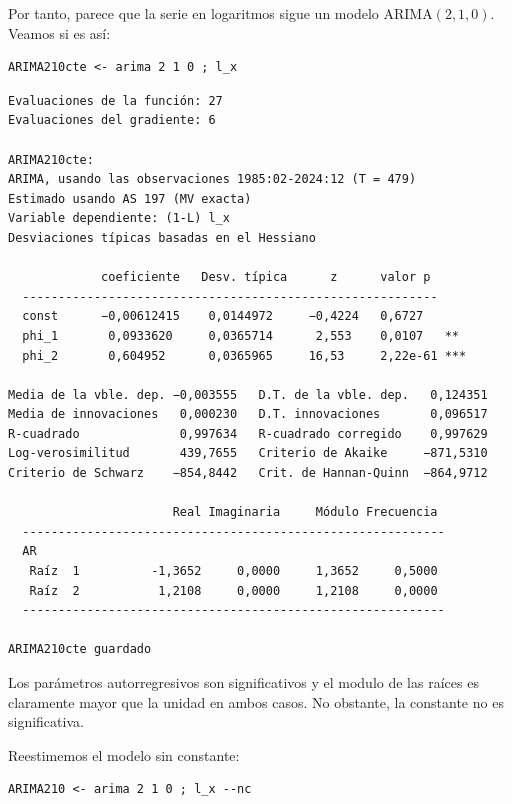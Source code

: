 \documentclass[10pt]{article}
\begin{document}
Por tanto, parece que la serie en logaritmos sigue un modelo
ARIMA\((2,1,0)\). Veamos si es así:

\begin{verbatim}
ARIMA210cte <- arima 2 1 0 ; l_x 
\end{verbatim}

\begin{verbatim}
Evaluaciones de la función: 27
Evaluaciones del gradiente: 6

ARIMA210cte:
ARIMA, usando las observaciones 1985:02-2024:12 (T = 479)
Estimado usando AS 197 (MV exacta)
Variable dependiente: (1-L) l_x
Desviaciones típicas basadas en el Hessiano

             coeficiente   Desv. típica      z      valor p 
  ----------------------------------------------------------
  const      −0,00612415    0,0144972     −0,4224   0,6727  
  phi_1       0,0933620     0,0365714      2,553    0,0107   **
  phi_2       0,604952      0,0365965     16,53     2,22e-61 ***

Media de la vble. dep. −0,003555   D.T. de la vble. dep.   0,124351
Media de innovaciones   0,000230   D.T. innovaciones       0,096517
R-cuadrado              0,997634   R-cuadrado corregido    0,997629
Log-verosimilitud       439,7655   Criterio de Akaike     −871,5310
Criterio de Schwarz    −854,8442   Crit. de Hannan-Quinn  −864,9712

                       Real Imaginaria     Módulo Frecuencia
  -----------------------------------------------------------
  AR
   Raíz  1          -1,3652     0,0000     1,3652     0,5000
   Raíz  2           1,2108     0,0000     1,2108     0,0000
  -----------------------------------------------------------

ARIMA210cte guardado
\end{verbatim}

Los parámetros autorregresivos son significativos y el modulo de las
raíces es claramente mayor que la unidad en ambos casos. No obstante,
la constante no es significativa. 

Reestimemos el modelo sin constante:

\begin{verbatim}
ARIMA210 <- arima 2 1 0 ; l_x --nc
\end{verbatim}
\end{document}
